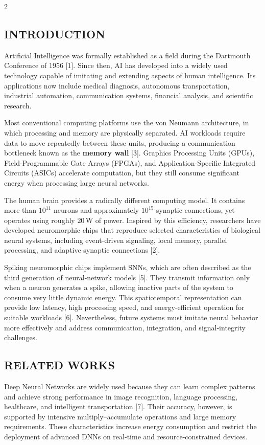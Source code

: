 \begin{multicols}{2}
  \subsection*{\centering\uppercase{Introduction}}
  Artificial Intelligence was formally established as a field during the Dartmouth Conference of 1956 [1]. Since then, AI has developed into a widely used technology capable of imitating and extending aspects of human intelligence. Its applications now include medical diagnosis, autonomous transportation, industrial automation, communication systems, financial analysis, and scientific research.

  \noindent
  Most conventional computing platforms use the von Neumann architecture, in which processing and memory are physically separated. AI workloads require data to move repeatedly between these units, producing a communication bottleneck known as the \textbf{memory wall} [3]. Graphics Processing Units (GPUs), Field-Programmable Gate Arrays (FPGAs), and Application-Specific Integrated Circuits (ASICs) accelerate computation, but they still consume significant energy when processing large neural networks.

  \noindent
  The human brain provides a radically different computing model. It contains more than \(10^{11}\) neurons and approximately \(10^{15}\) synaptic connections, yet operates using roughly \(20\,\mathrm{W}\) of power. Inspired by this efficiency, researchers have developed neuromorphic chips that reproduce selected characteristics of biological neural systems, including event-driven signaling, local memory, parallel processing, and adaptive synaptic connections [2].

  \noindent
  Spiking neuromorphic chips implement SNNs, which are often described as the third generation of neural-network models [5]. They transmit information only when a neuron generates a spike, allowing inactive parts of the system to consume very little dynamic energy. This spatiotemporal representation can provide low latency, high processing speed, and energy-efficient operation for suitable workloads [6]. Nevertheless, future systems must imitate neural behavior more effectively and address communication, integration, and signal-integrity challenges.

  \subsection*{\centering\uppercase{Related Works}}
  Deep Neural Networks are widely used because they can learn complex patterns and achieve strong performance in image recognition, language processing, healthcare, and intelligent transportation [7]. Their accuracy, however, is supported by intensive multiply--accumulate operations and large memory requirements. These characteristics increase energy consumption and restrict the deployment of advanced DNNs on real-time and resource-constrained devices.


\end{multicols}
